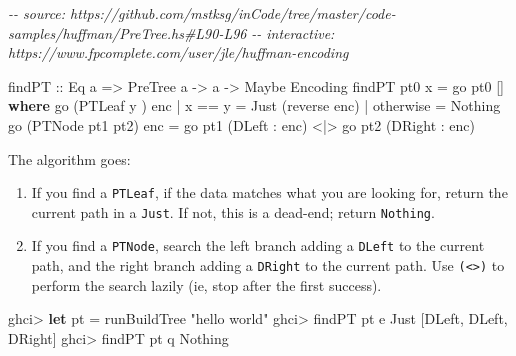\documentclass[]{article}
\newenvironment{Shaded}{}{}
\newcommand{\CharTok}[1]{\textcolor[rgb]{0.25,0.44,0.63}{#1}}
\newcommand{\CommentTok}[1]{\textcolor[rgb]{0.38,0.63,0.69}{\textit{#1}}}
\newcommand{\DataTypeTok}[1]{\textcolor[rgb]{0.56,0.13,0.00}{#1}}
\newcommand{\FunctionTok}[1]{\textcolor[rgb]{0.02,0.16,0.49}{#1}}
\newcommand{\KeywordTok}[1]{\textcolor[rgb]{0.00,0.44,0.13}{\textbf{#1}}}
\newcommand{\NormalTok}[1]{#1}
\newcommand{\OperatorTok}[1]{\textcolor[rgb]{0.40,0.40,0.40}{#1}}
\newcommand{\OtherTok}[1]{\textcolor[rgb]{0.00,0.44,0.13}{#1}}
\newcommand{\StringTok}[1]{\textcolor[rgb]{0.25,0.44,0.63}{#1}}
\begin{document}
\begin{Shaded}
\begin{Highlighting}[]
\CommentTok{{-}{-} source: https://github.com/mstksg/inCode/tree/master/code{-}samples/huffman/PreTree.hs\#L90{-}L96}
\CommentTok{{-}{-} interactive: https://www.fpcomplete.com/user/jle/huffman{-}encoding}

\OtherTok{findPT ::} \DataTypeTok{Eq}\NormalTok{ a }\OtherTok{=\textgreater{}} \DataTypeTok{PreTree}\NormalTok{ a }\OtherTok{{-}\textgreater{}}\NormalTok{ a }\OtherTok{{-}\textgreater{}} \DataTypeTok{Maybe} \DataTypeTok{Encoding}
\NormalTok{findPT pt0 x }\OtherTok{=}\NormalTok{ go pt0 []}
  \KeywordTok{where}
\NormalTok{    go (}\DataTypeTok{PTLeaf}\NormalTok{ y      ) enc }\OperatorTok{|}\NormalTok{ x }\OperatorTok{==}\NormalTok{ y    }\OtherTok{=} \DataTypeTok{Just}\NormalTok{ (}\FunctionTok{reverse}\NormalTok{ enc)}
                            \OperatorTok{|} \FunctionTok{otherwise} \OtherTok{=} \DataTypeTok{Nothing}
\NormalTok{    go (}\DataTypeTok{PTNode}\NormalTok{ pt1 pt2) enc }\OtherTok{=}\NormalTok{ go pt1 (}\DataTypeTok{DLeft}  \OperatorTok{:}\NormalTok{ enc) }\OperatorTok{\textless{}|\textgreater{}}
\NormalTok{                              go pt2 (}\DataTypeTok{DRight} \OperatorTok{:}\NormalTok{ enc)}
\end{Highlighting}
\end{Shaded}

The algorithm goes:

\begin{enumerate}
\def\labelenumi{\arabic{enumi}.}
\item
  If you find a \texttt{PTLeaf}, if the data matches what you are looking for,
  return the current path in a \texttt{Just}. If not, this is a dead-end; return
  \texttt{Nothing}.
\item
  If you find a \texttt{PTNode}, search the left branch adding a \texttt{DLeft}
  to the current path, and the right branch adding a \texttt{DRight} to the
  current path. Use \texttt{(\textless{}\textbar{}\textgreater{})} to perform
  the search lazily (ie, stop after the first success).
\end{enumerate}

\begin{Shaded}
\begin{Highlighting}[]
\NormalTok{ghci}\OperatorTok{\textgreater{}} \KeywordTok{let}\NormalTok{ pt }\OtherTok{=}\NormalTok{ runBuildTree }\StringTok{"hello world"}
\NormalTok{ghci}\OperatorTok{\textgreater{}}\NormalTok{ findPT pt }\CharTok{\textquotesingle{}e\textquotesingle{}}
\DataTypeTok{Just}\NormalTok{ [}\DataTypeTok{DLeft}\NormalTok{, }\DataTypeTok{DLeft}\NormalTok{, }\DataTypeTok{DRight}\NormalTok{]}
\NormalTok{ghci}\OperatorTok{\textgreater{}}\NormalTok{ findPT pt }\CharTok{\textquotesingle{}q\textquotesingle{}}
\DataTypeTok{Nothing}
\end{Highlighting}
\end{Shaded}
\end{document}
